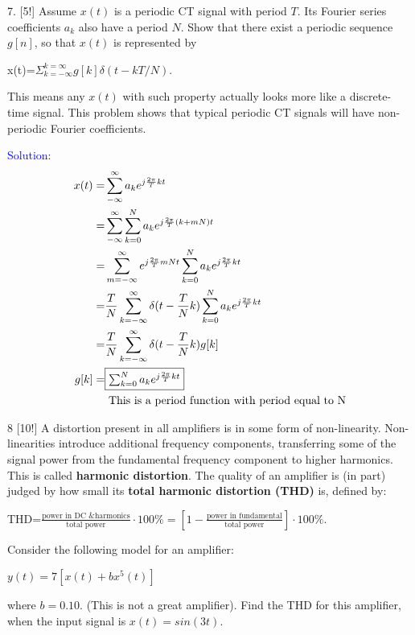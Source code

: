 \documentclass[12pt,a4paper]{article}
\begin{document}
\begin{tcolorbox}[colback = white]
7. [5!] Assume $x(t)$ is a periodic CT signal with period $T$. Its Fourier series coefficients $a_k$ also have a period $N$. Show that there exist a periodic sequence $g[n]$, so that $x(t)$ is represented by
\begin{center}
    x(t)=$\Sigma_{k=-\infty}^{k=\infty}g[k]\delta(t-kT/N)$.
\end{center}
This means any $x(t)$ with such property actually looks more like a discrete-time signal. This problem shows that typical periodic CT signals will have non-periodic Fourier coefficients.
\end{tcolorbox}
\begin{tcolorbox}
\normalsize
\textcolor{blue}{Solution:\\
\begin{equation*}
    \begin{aligned}
        x(t)=&\sum_{-\infty}^\infty a_k e^{j\frac{2\pi}{T}kt}\\
        =&\sum_{-\infty}^\infty \sum_{k=0}^N a_k e^{j\frac{2\pi}{T}(k+mN)t}\\
        =&\sum_{m=-\infty}^\infty e^{j\frac{2\pi}{T}mNt}\sum_{k=0}^N a_ke^{j\frac{2\pi}{T}kt}\\
        =&\frac{T}{N}\sum_{k=-\infty}^\infty \delta(t-\frac{T}{N}k)\sum_{k=0}^N a_k e^{j\frac{2\pi}{T}kt}\\
        =&\frac{T}{N}\sum_{k=-\infty}^\infty \delta(t-\frac{T}{N}k)g[k]\\
        g[k]=&\fbox{$\sum_{k=0}^N a_k e^{j\frac{2\pi}{T}kt}$}\\
        &\text{ This is a period function with period equal to N}
    \end{aligned}
\end{equation*}
}
\end{tcolorbox}

\begin{tcolorbox}[colback = white]
8 [10!] A distortion present in all amplifiers is in some form of non-linearity. Non-linearities introduce additional frequency components, transferring some of the signal power from the fundamental frequency component to higher harmonics. This is called \textbf{harmonic distortion}. The quality of an amplifier is (in part) judged by how small its \textbf{total harmonic distortion (THD)} is, defined by:
\begin{center}
    THD=$\frac{\mbox{power in DC \& harmonics}}{\mbox{total power}}\cdot 100\%=[1-\frac{\mbox{power in fundamental}}{\mbox{total power}}] \cdot 100\%$.
\end{center}
Consider the following model for an amplifier:
\begin{center}
$y(t)=7[x(t)+bx^5(t)]$
\end{center}
where $b=0.10.$ (This is not a great amplifier). Find the THD for this amplifier, when the input signal is $x(t)=sin(3t)$.
\end{tcolorbox}
\end{document}
